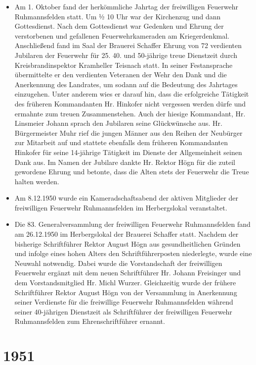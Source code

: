 \documentclass[12pt,a4paper]{book}
\begin{document}
\begin{itemize}
\item Am 1. Oktober fand der herkömmliche Jahrtag der freiwilligen
Feuerwehr Ruhmannsfelden statt. Um ½ 10 Uhr war der Kirchenzug und dann
Gottesdienst. Nach dem Gottesdienst war Gedenken und Ehrung der
verstorbenen und gefallenen Feuerwehrkameraden am Kriegerdenkmal.
Anschließend fand im Saal der Brauerei Schaffer Ehrung von 72 verdienten
Jubilaren der Feuerwehr für 25. 40. und 50-jährige treue Dienstzeit
durch Kreisbrandinspektor Kramheller Teisnach statt. In seiner
Festansprache übermittelte er den verdienten Veteranen der Wehr den Dank
und die Anerkennung des Landrates, um sodann auf die Bedeutung des
Jahrtages einzugehen. Unter anderem wies er darauf hin, dass die
erfolgreiche Tätigkeit des früheren Kommandanten Hr. Hinkofer nicht
vergessen werden dürfe und ermahnte zum treuen Zusammenstehen. Auch der
hiesige Kommandant, Hr. Linsmeier Johann sprach den Jubilaren seine
Glückwünsche aus. Hr. Bürgermeister Muhr rief die jungen Männer aus den
Reihen der Neubürger zur Mitarbeit auf und stattete ebenfalls dem
früheren Kommandanten Hinkofer für seine 14-jährige Tätigkeit im Dienste
der Allgemeinheit seinen Dank aus. Im Namen der Jubilare dankte Hr.
Rektor Högn für die zuteil gewordene Ehrung und betonte, dass die Alten
stets der Feuerwehr die Treue halten werden.

\item Am 8.12.1950 wurde ein Kameradschaftsabend der aktiven Mitglieder
der freiwilligen Feuerwehr Ruhmannsfelden im Herbergslokal veranstaltet.

\item Die 83. Generalversammlung der freiwilligen Feuerwehr
Ruhmannsfelden fand am 26.12.1950 im Herbergslokal der Brauerei Schaffer
statt. Nachdem der bisherige Schriftführer Rektor August Högn aus
gesundheitlichen Gründen und infolge eines hohen Alters den
Schriftführerposten niederlegte, wurde eine Neuwahl notwendig. Dabei
wurde die Vorstandschaft der freiwilligen Feuerwehr ergänzt mit dem
neuen Schriftführer Hr. Johann Freisinger und dem Vorstandsmitglied Hr.
Michl Wurzer. Gleichzeitig wurde der frühere Schriftführer Rektor August
Högn von der Versammlung in Anerkennung seiner Verdienste für die
freiwillige Feuerwehr Ruhmannsfelden während seiner 40-jährigen
Dienstzeit als Schriftführer der freiwilligen Feuerwehr Ruhmannsfelden
zum Ehrenschriftführer ernannt.
\end{itemize}

\section*{1951}
\end{document}
